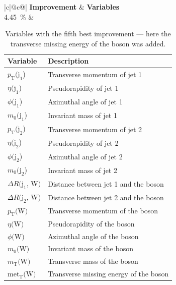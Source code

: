 \begin{table}[h]
    \centering
    \label{tab:app_vars_5}
    \caption{Variables with the fifth best improvement --- here the transverse missing energy of the \PW boson was added.}
    \begin{tabular}{ |c|@{}c@{}| }
        \hline
        \textbf{Improvement} & \textbf{Variables}\\
        \hline
        \SI{4.45}{\%} & 
        \begin{tabular}{ll}
            \hline
            Variable & Description\\
            \hline
            $p_\text{T}\text{(j}_\text{1}$) & Transverse momentum of jet 1\\
            $\eta\text{(j}_\text{1}$) & Pseudorapidity of jet 1\\
            $\phi\text{(j}_\text{1}$) & Azimuthal angle of jet 1\\
            $m_0\text{(j}_\text{1}$) & Invariant mass of jet 1\\

            $p_\text{T}\text{(j}_\text{2}$) & Transverse momentum of jet 2\\
            $\eta\text{(j}_\text{2}$) & Pseudorapidity of jet 2\\
            $\phi\text{(j}_\text{2}$) & Azimuthal angle of jet 2\\
            $m_0\text{(j}_\text{2}$) & Invariant mass of jet 2\\

            $\Delta R\text{(j}_\text{1}\text{, W)}$ & Distance between jet 1 and the \PW boson\\
            $\Delta R\text{(j}_\text{2}\text{, W)}$ & Distance between jet 2 and the \PW boson\\

            $p_\text{T}\text{(W)}$ & Transverse momentum of the \PW boson\\
            $\eta\text{(W)}$ & Pseudorapidity of the \PW boson\\
            $\phi\text{(W)}$ & Azimuthal angle of the \PW boson\\
            $m_0\text{(W)}$ & Invariant mass of the \PW boson\\
            $m_\text{T}\text{(W)}$ & Transverse mass of the \PW boson\\
            $\text{met}_\text{T}\text{(W)}$ & Transverse missing energy of the \PW boson\\
            \hline
        \end{tabular}\\
        \hline
    \end{tabular}
\end{table}

